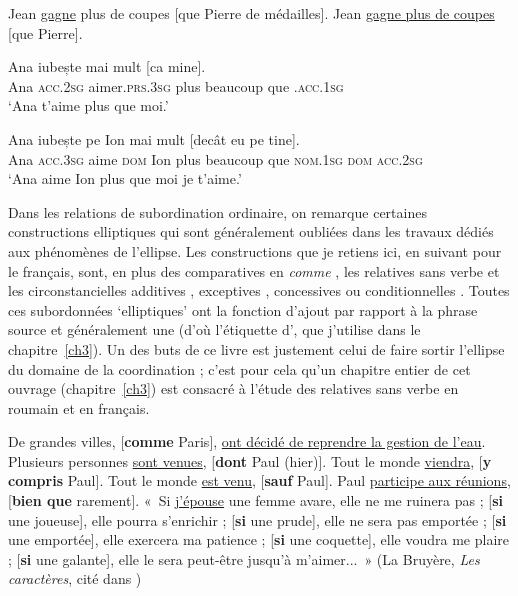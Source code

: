 \ea
\ea  Jean \uline{gagne} plus de coupes [que Pierre de médailles]. \label{ch1:ex86a}
\ex  Jean \uline{gagne plus de coupes} [que Pierre]. \citep{AmsiliEtAl2008} \label{ch1:ex86b}
\z
\z

\ea \label{ch1:ex87}
\ea
\gll  Ana   iubește mai  mult  [ca  mine]. \label{ch1:ex87a}\\
Ana  \textsc{acc.2sg}  aimer\textsc{.prs.3sg}  plus  beaucoup  que \textsc{.acc.1sg} \\
\glt ‘Ana t’aime plus que moi.’ 

\ex
\gll  Ana   iubește pe  Ion  mai  mult  [decât  eu  pe  tine]. \label{ch1:ex87b} \\
Ana  \textsc{acc.3sg}  aime  \textsc{dom}  Ion  plus  beaucoup  que  \textsc{nom.1sg} \textsc{dom}  \textsc{acc.2sg}  \\
\glt ‘Ana aime Ion plus que moi je t’aime.’
\z
\z

Dans les relations de subordination ordinaire, on remarque certaines constructions elliptiques qui sont généralement oubliées dans les travaux dédiés aux phé\-nomènes de l’ellipse. Les constructions que je retiens ici, en suivant \citet{AbeilleToAppear} pour le français, sont, en plus des comparatives en \textit{comme} , les relatives sans verbe  et les circonstancielles additives , exceptives , concessives  ou conditionnelles . Toutes ces subordonnées ‘elliptiques’ ont la fonction d’ajout par rapport à la phrase source et généralement une  (d’où l’étiquette d’, que j’utilise dans le chapitre~\ref{ch3}). Un des buts de ce livre est justement celui de faire sortir l’ellipse du domaine de la coordination ; c’est pour cela qu’un chapitre entier de cet ouvrage (chapitre~\ref{ch3}) est consacré à l’étude des relatives sans verbe en roumain et en français.

\ea
\ea  De grandes villes, [\textbf{comme} Paris], \uline{ont décidé de reprendre la gestion de l’eau}. \label{ch1:ex88a} 
\ex  Plusieurs personnes \uline{sont venues}, [\textbf{dont} Paul (hier)]. \label{ch1:ex88b} 
\ex  Tout le monde \uline{viendra}, [\textbf{y compris} Paul]. \label{ch1:ex88c}
\ex  Tout le monde \uline{est venu}, [\textbf{sauf} Paul]. \label{ch1:ex88d}
\ex  Paul \uline{participe aux réunions}, [\textbf{bien que} rarement]. \label{ch1:ex88e}
\ex  «~Si \uline{j’épouse} une femme avare, elle ne me ruinera pas ; [\textbf{si} une joueuse], elle pourra s’enrichir ; [\textbf{si} une prude], elle ne sera pas emportée ; [\textbf{si} une emportée], elle exercera ma patience ; [\textbf{si} une coquette], elle voudra me plaire ; [\textbf{si} une galante], elle le sera peut-être jusqu’à m’aimer...~» (La Bruyère, \textit{Les caractères}, cité dans \citealt{Piot1988}) \label{ch1:ex88f}
\z
\z

